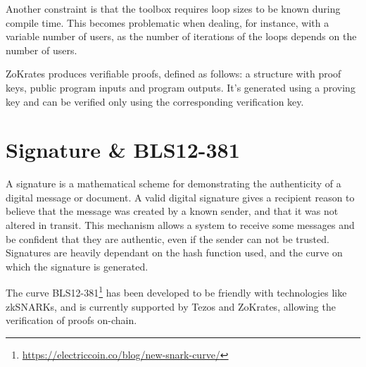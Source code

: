 Another constraint is that the toolbox requires loop sizes to be known during compile time. This becomes problematic when dealing, for instance, with a variable number of users, as the number of iterations of the loops depends on the number of users.

ZoKrates produces verifiable proofs, defined as follows: a structure with proof keys, public program inputs and program outputs. It's generated using a proving key and can be verified only using the corresponding verification key.

\section{Signature \& BLS12-381}

A signature is a mathematical scheme for demonstrating the authenticity of a digital message or document. A valid digital signature gives a recipient reason to believe that the message was created by a known sender, and that it was not altered in transit. This mechanism allows a system to receive some messages and be confident that they are authentic, even if the sender can not be trusted. Signatures are heavily dependant on the hash function used, and the curve on which the signature is generated.

The curve BLS12-381\footnote{\url{https://electriccoin.co/blog/new-snark-curve/}} has been developed to be friendly with technologies like zkSNARKs, and is currently supported by Tezos and ZoKrates, allowing the verification of proofs on-chain.